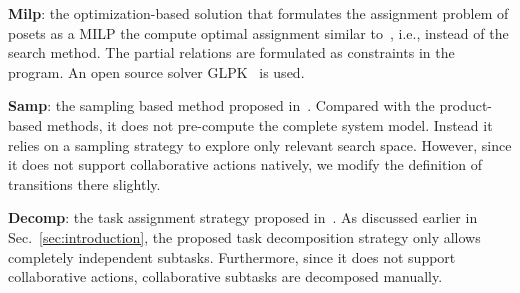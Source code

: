 \textbf{Milp}: the optimization-based solution that
formulates the assignment problem of posets as a MILP
the compute optimal assignment similar
to~\cite{luo2021temporal, jones2019scratchs},
i.e., instead of the search method.
The partial relations are formulated as constraints
in the program.
An open source solver GLPK~\cite{makhorin2008glpk} is used.

\textbf{Samp}: the sampling based method proposed
in~\cite{kantaros2020stylus}.
Compared with the product-based methods, it does not pre-compute
the complete system model. Instead it relies on a sampling strategy
to explore only relevant search space.
However, since it does not support collaborative actions natively,
we modify the definition of transitions there slightly.

\textbf{Decomp}: the task assignment strategy proposed
in~\cite{schillinger2018simultaneous}.
As discussed earlier in Sec.~\ref{sec:introduction},
the proposed task decomposition strategy only allows completely
independent subtasks.
Furthermore, since it does not support collaborative actions,
collaborative subtasks are decomposed manually.
